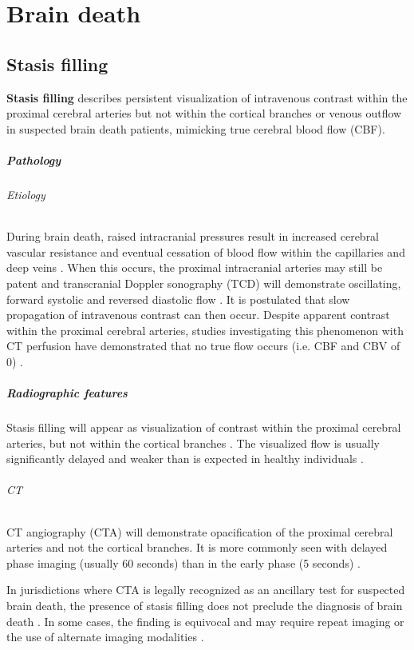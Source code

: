 \chapter{Brain death}

\section{Stasis filling}

\textbf{Stasis filling} describes persistent visualization of intravenous contrast within the proximal cerebral arteries but not within the cortical branches or venous outflow in suspected brain death patients, mimicking true cerebral blood flow (CBF).

\paragraph{Pathology}

\subparagraph{Etiology}

During brain death, raised intracranial pressures result in increased cerebral vascular resistance and eventual cessation of blood flow within the capillaries and deep veins . When this occurs, the proximal intracranial arteries may still be patent and transcranial Doppler sonography (TCD) will demonstrate oscillating, forward systolic and reversed diastolic flow . It is postulated that slow propagation of intravenous contrast can then occur. Despite apparent contrast within the proximal cerebral arteries, studies investigating this phenomenon with CT perfusion have demonstrated that no true flow occurs (i.e. CBF and CBV of 0) .

\paragraph{Radiographic features}

Stasis filling will appear as visualization of contrast within the proximal cerebral arteries, but not within the cortical branches . The visualized flow is usually significantly delayed and weaker than is expected in healthy individuals .

\subparagraph{CT}

CT angiography (CTA) will demonstrate opacification of the proximal cerebral arteries and not the cortical branches. It is more commonly seen with delayed phase imaging (usually 60 seconds) than in the early phase (5 seconds) .

In jurisdictions where CTA is legally recognized as an ancillary test for suspected brain death, the presence of stasis filling does not preclude the diagnosis of brain death . In some cases, the finding is equivocal and may require repeat imaging or the use of alternate imaging modalities .

